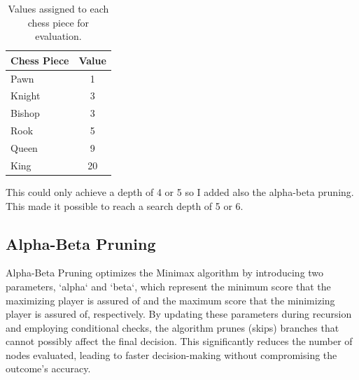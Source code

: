 \documentclass{article}
\begin{document}
\begin{table}[ht]
\centering
\begin{tabular}{|l|c|}
\hline
\textbf{Chess Piece} & \textbf{Value} \\
\hline
Pawn & 1 \\
\hline
Knight & 3 \\
\hline
Bishop & 3 \\
\hline
Rook & 5 \\
\hline
Queen & 9 \\
\hline
King & 20 \\
\hline
\end{tabular}
\caption{Values assigned to each chess piece for evaluation.}
\label{table:chess_piece_values}
\end{table}


This could only achieve a depth of 4 or 5 so I added also the alpha-beta pruning. This made it possible to reach a search depth of 5 or 6.





















\subsection{Alpha-Beta Pruning}

 Alpha-Beta Pruning optimizes the Minimax algorithm by introducing two parameters, `alpha` and `beta`, which represent the minimum score that the maximizing player is assured of and the maximum score that the minimizing player is assured of, respectively. By updating these parameters during recursion and employing conditional checks, the algorithm prunes (skips) branches that cannot possibly affect the final decision. This significantly reduces the number of nodes evaluated, leading to faster decision-making without compromising the outcome's accuracy.
\end{document}
